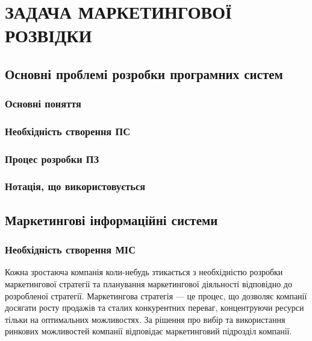 ﻿\section{ЗАДАЧА МАРКЕТИНГОВОЇ РОЗВІДКИ}
%
\subsection{Основні проблемі розробки програмних систем}
\subsubsection{Основні поняття}
\subsubsection{Необхідність створення ПС}
\subsubsection{Процес розробки ПЗ}
\subsubsection{Нотація, що використовується}

\subsection{Маркетингові інформаційні системи}
\subsubsection{Необхідність створення МІС}
Кожна зростаюча компанія коли-небудь зтикається з необхідністю розробки маркетингової стратегії та планування маркетингової діяльності відповідно до розробленої стратегії. Маркетингова стратегія --- це процес, що дозволяє компанії досягати росту продажів та сталих конкурентних переваг, концентруючи ресурси тільки на оптимальних можливостях\cite{baker}. За рішення про вибір та використання ринкових можливостей компанії відповідає маркетинговий підрозділ компанії. 
 
